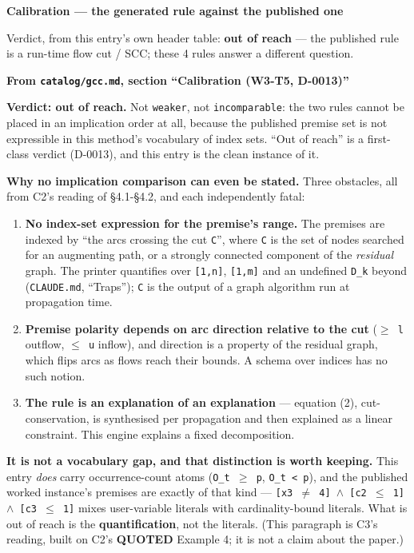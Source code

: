 \documentclass[10pt,a4paper]{article}
\newcommand{\provtag}[2]{{\small\sffamily\bfseries\textcolor{#1}{#2}}}
\newenvironment{calblock}{%
  \par\smallskip
  \def\FrameCommand{\textcolor{calbar}{\vrule width 1pt}\hspace{9pt}}%
  \MakeFramed{\advance\hsize-\width\FrameRestore}}%
  {\endMakeFramed\par\smallskip}
\newcommand{\calhead}[1]{{\sffamily\bfseries\large\textcolor{calbar}{#1}\par}}
\newcommand{\litsubsub}[1]{\par{\sffamily\bfseries\small #1\par}}
\begin{document}
\begin{calblock}
\calhead{Calibration --- the generated rule against the published one}
{\small\sffamily Verdict, from this entry's own header table: \textbf{out of reach} --- the published rule is a run-time flow cut / SCC; these 4 rules answer a different question.\par}
\litsubsub{From \texttt{catalog/gcc.md}, section ``Calibration (W3-T5, D-0013)''}
\textbf{Verdict: out of reach.} Not \texttt{weaker}, not \texttt{incomparable}: the two rules cannot be placed in an implication order at all, because the published premise set is not expressible in this method's vocabulary of index sets. ``Out of reach'' is a first-class verdict (D-0013), and this entry is the clean instance of it.

\textbf{Why no implication comparison can even be stated.} Three obstacles, all from C2's reading of \S{}4.1-\S{}4.2, and each independently fatal:

\begin{enumerate}\setlength{\itemsep}{0pt}
\item \textbf{No index-set expression for the premise's range.} The premises are indexed by ``the arcs crossing the cut \texttt{C}'', where \texttt{C} is the set of nodes searched for an augmenting path, or a strongly connected component of the \emph{residual} graph. The printer quantifies over \texttt{[1,n]}, \texttt{[1,m]} and an undefined \texttt{D\_k} beyond (\texttt{CLAUDE.md}, ``Traps''); \texttt{C} is the output of a graph algorithm run at propagation time.
\item \textbf{Premise polarity depends on arc direction relative to the cut} (\texttt{$\geq$ l} outflow, \texttt{$\leq$ u} inflow), and direction is a property of the residual graph, which flips arcs as flows reach their bounds. A schema over indices has no such notion.
\item \textbf{The rule is an explanation of an explanation} --- equation (2), cut-conservation, is synthesised per propagation and then explained as a linear constraint. This engine explains a fixed decomposition.
\end{enumerate}
\textbf{It is not a vocabulary gap, and that distinction is worth keeping.} This entry \emph{does} carry occurrence-count atoms (\texttt{O\_t $\geq$ p}, \texttt{O\_t < p}), and the published worked instance's premises are exactly of that kind --- \texttt{[x3 $\neq$ 4] $\wedge$ [c2 $\leq$ 1] $\wedge$ [c3 $\leq$ 1]} mixes user-variable literals with cardinality-bound literals. What is out of reach is the \textbf{quantification}, not the literals. (This paragraph is C3's reading, built on C2's \provtag{tagquoted}{QUOTED} Example 4; it is not a claim about the paper.)


\end{calblock}
\end{document}
